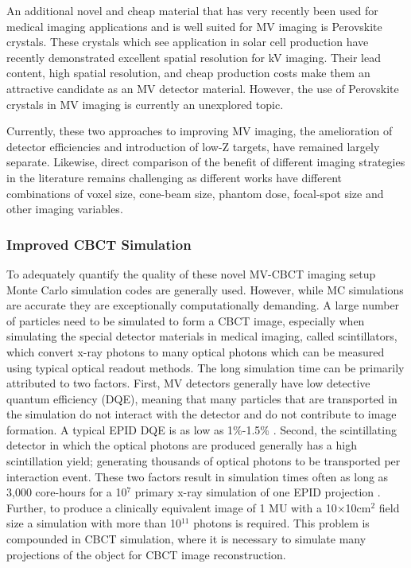 An additional novel and cheap material that has very recently been used for medical imaging applications and is well suited for MV imaging is Perovskite crystals. These crystals which see application in solar cell production have recently demonstrated excellent spatial resolution for kV imaging\cite{Gill2018FlexibleApplications,Butey2021CurrentTechnology,Zhu2020Low-doseScintillators}. Their lead content, high spatial resolution, and cheap production costs make them an attractive candidate as an MV detector material. However, the use of Perovskite crystals in MV imaging is currently an unexplored topic.

Currently, these two approaches to improving MV imaging, the amelioration of detector efficiencies and introduction of low-Z targets, have remained largely separate. Likewise, direct comparison of the benefit of different imaging strategies in the literature remains challenging as different works have different combinations of voxel size, cone-beam size, phantom dose, focal-spot size and other imaging variables.

\subsubsection{Improved CBCT Simulation}

To adequately quantify the quality of these novel MV-CBCT imaging setup Monte Carlo simulation codes are generally used. However, while MC simulations are accurate they are exceptionally computationally demanding. A large number of particles need to be simulated to form a CBCT image, especially when simulating the special detector materials in medical imaging, called scintillators, which convert x-ray photons to many optical photons which can be measured using typical optical readout methods. The long simulation time can be primarily attributed to two factors. First, MV detectors generally have low detective quantum efficiency (DQE), meaning that many particles that are transported in the simulation do not interact with the detector and do not contribute to image formation. A typical EPID DQE is as low as 1\%-1.5\% \cite{Myronakis2017AOptimization:,Hu2017APerformance}. Second, the scintillating detector in which the optical photons are produced generally has a high scintillation yield; generating thousands of optical photons to be transported per interaction event. These two factors result in simulation times often as long as 3,000 core-hours for a 10$^7$ primary x-ray simulation of one EPID projection \cite{Blake2013CharacterizationGeant4}. Further, to produce a clinically equivalent image of 1 MU with a 10$\times$10cm$^2$ field size a simulation with more than 10$^{11}$ photons is required\cite{Shi2019ADetectors.,Star-Lack2014RapidDQEf,Rottmann2016AEfficiency}. This problem is compounded in CBCT simulation, where it is necessary to simulate many projections of the object for CBCT image reconstruction.

